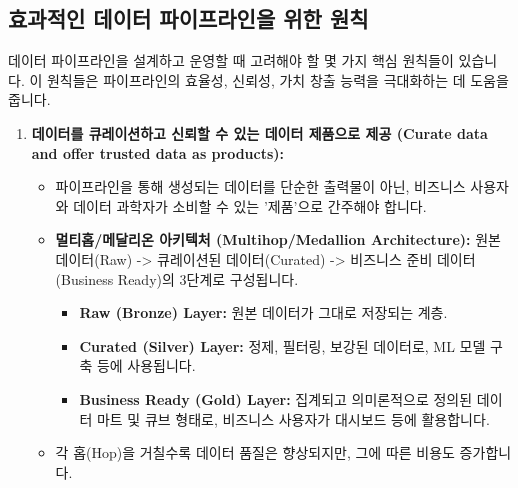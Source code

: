 \documentclass[11pt,a4paper]{article}
\theoremstyle{definition}
\begin{document}
\subsection{효과적인 데이터 파이프라인을 위한 원칙}

데이터 파이프라인을 설계하고 운영할 때 고려해야 할 몇 가지 핵심 원칙들이 있습니다. 이 원칙들은 파이프라인의 효율성, 신뢰성, 가치 창출 능력을 극대화하는 데 도움을 줍니다.

\begin{enumerate}
    \item \textbf{데이터를 큐레이션하고 신뢰할 수 있는 데이터 제품으로 제공 (Curate data and offer trusted data as products):}
    \begin{itemize}
        \item 파이프라인을 통해 생성되는 데이터를 단순한 출력물이 아닌, 비즈니스 사용자와 데이터 과학자가 소비할 수 있는 '제품'으로 간주해야 합니다.
        \item \textbf{멀티홉/메달리온 아키텍처 (Multihop/Medallion Architecture):} 원본 데이터(Raw) -> 큐레이션된 데이터(Curated) -> 비즈니스 준비 데이터(Business Ready)의 3단계로 구성됩니다.
        \begin{itemize}
            \item \textbf{Raw (Bronze) Layer:} 원본 데이터가 그대로 저장되는 계층.
            \item \textbf{Curated (Silver) Layer:} 정제, 필터링, 보강된 데이터로, ML 모델 구축 등에 사용됩니다.
            \item \textbf{Business Ready (Gold) Layer:} 집계되고 의미론적으로 정의된 데이터 마트 및 큐브 형태로, 비즈니스 사용자가 대시보드 등에 활용합니다.
        \end{itemize}
        \item 각 홉(Hop)을 거칠수록 데이터 품질은 향상되지만, 그에 따른 비용도 증가합니다.
    \end{itemize}


\end{enumerate}
\end{document}
